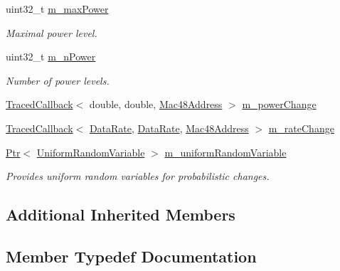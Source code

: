 \begin{DoxyCompactItemize}
uint32\+\_\+t \hyperlink{classns3_1_1RrpaaWifiManager_a8f5659ec5d99c385dcde039364b0ec8a}{m\+\_\+max\+Power}
\begin{DoxyCompactList}\small\item\em Maximal power level. \end{DoxyCompactList}\item 
uint32\+\_\+t \hyperlink{classns3_1_1RrpaaWifiManager_a109cb03ae105835a26ff09f82c5db6a2}{m\+\_\+n\+Power}
\begin{DoxyCompactList}\small\item\em Number of power levels. \end{DoxyCompactList}\item 
\hyperlink{classns3_1_1TracedCallback}{Traced\+Callback}$<$ double, double, \hyperlink{classns3_1_1Mac48Address}{Mac48\+Address} $>$ \hyperlink{classns3_1_1RrpaaWifiManager_a4f6bc3b3289bae4f456cff3062a6ebc0}{m\+\_\+power\+Change}
\item 
\hyperlink{classns3_1_1TracedCallback}{Traced\+Callback}$<$ \hyperlink{classns3_1_1DataRate}{Data\+Rate}, \hyperlink{classns3_1_1DataRate}{Data\+Rate}, \hyperlink{classns3_1_1Mac48Address}{Mac48\+Address} $>$ \hyperlink{classns3_1_1RrpaaWifiManager_a8036ec80b5e8683768e0081ed8f52100}{m\+\_\+rate\+Change}
\item 
\hyperlink{classns3_1_1Ptr}{Ptr}$<$ \hyperlink{classns3_1_1UniformRandomVariable}{Uniform\+Random\+Variable} $>$ \hyperlink{classns3_1_1RrpaaWifiManager_a04e94944516bbae00d3873065258aaad}{m\+\_\+uniform\+Random\+Variable}
\begin{DoxyCompactList}\small\item\em Provides uniform random variables for probabilistic changes. \end{DoxyCompactList}\end{DoxyCompactItemize}
\subsection*{Additional Inherited Members}


\subsection{Member Typedef Documentation}
